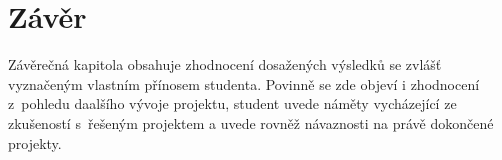 \chapter{Závěr}                                                           %
Závěrečná kapitola obsahuje zhodnocení dosažených výsledků se zvlášť vyznačeným vlastním přínosem studenta. Povinně se zde objeví i zhodnocení z~pohledu daalšího vývoje projektu, student uvede náměty vycházející ze zkušeností s~řešeným projektem a uvede rovněž návaznosti na právě dokončené projekty.

